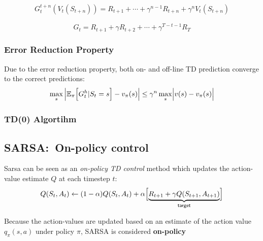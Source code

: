 \newpar{}
\noindent\begin{align*}
    G_t^{t+n}(V_t(S_{t+n})) = R_{t+1} + \cdots + \gamma^{n-1}R_{t+n} + \gamma^n V_t(S_{t+n})
\end{align*}

\newpar{}
\noindent\begin{equation*}
    G_t = R_{t+1}+\gamma R_{t+2} + \cdots + \gamma^{T-t-1}R_T
\end{equation*}

\subsubsection{Error Reduction Property}
Due to the error reduction property, both on- and off-line TD prediction converge to the correct predictions:
\noindent\begin{equation*}
    \max_s \left|\mathbb{E}_\pi\Bigl[G_t^h | S_t=s\Bigr] - v_\pi(s)\right| \leq \gamma^n \max_s \Bigl|v(s) - v_\pi(s)\Bigr|
\end{equation*}

\subsubsection{TD(0) Algortihm}
\begin{algorithmic}
    \EndWhile{}
    \EndFor{}
\end{algorithmic}

\subsection{SARSA:\ On-policy control}
Sarsa can be seen as an \textit{on-policy TD control} method which updates the action-value estimate $Q$ at each timestep $t$:
\noindent\begin{equation*}
    Q(S_t, A_t) \gets (1-\alpha)Q(S_t, A_t) + \alpha \Bigl[\underbrace{R_{t+1} + \gamma Q(S_{t+1}, A_{t+1})}_{\textsf{target}} \Bigr]
\end{equation*}

Because the action-values are updated based on an estimate of the action value $q_\pi(s,a)$ under policy $\pi$, SARSA is considered \textbf{on-policy}

